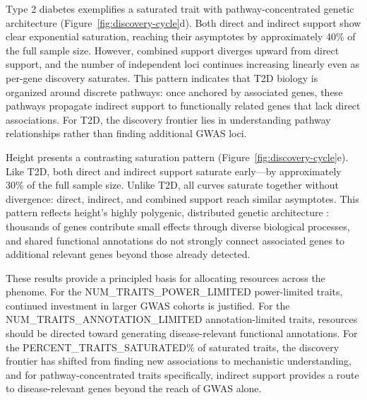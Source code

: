 Type 2 diabetes exemplifies a saturated trait with pathway-concentrated genetic architecture (Figure~\ref{fig:discovery-cycle}d). Both direct and indirect support show clear exponential saturation, reaching their asymptotes by approximately 40\% of the full sample size. However, combined support diverges upward from direct support, and the number of independent loci continues increasing linearly even as per-gene discovery saturates. This pattern indicates that T2D biology is organized around discrete pathways: once anchored by associated genes, these pathways propagate indirect support to functionally related genes that lack direct associations. For T2D, the discovery frontier lies in understanding pathway relationships rather than finding additional GWAS loci.

Height presents a contrasting saturation pattern (Figure~\ref{fig:discovery-cycle}e). Like T2D, both direct and indirect support saturate early---by approximately 30\% of the full sample size. Unlike T2D, all curves saturate together without divergence: direct, indirect, and combined support reach similar asymptotes. This pattern reflects height's highly polygenic, distributed genetic architecture \cite{yengo_saturated_2022}: thousands of genes contribute small effects through diverse biological processes, and shared functional annotations do not strongly connect associated genes to additional relevant genes beyond those already detected.

These results provide a principled basis for allocating resources across the phenome. For the {{NUM_TRAITS_POWER_LIMITED}} power-limited traits, continued investment in larger GWAS cohorts is justified. For the {{NUM_TRAITS_ANNOTATION_LIMITED}} annotation-limited traits, resources should be directed toward generating disease-relevant functional annotations. For the {{PERCENT_TRAITS_SATURATED}}\% of saturated traits, the discovery frontier has shifted from finding new associations to mechanistic understanding, and for pathway-concentrated traits specifically, indirect support provides a route to disease-relevant genes beyond the reach of GWAS alone.


